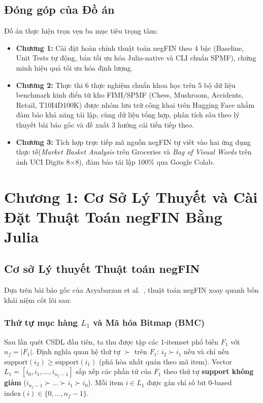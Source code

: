 \documentclass[conference]{IEEEtran}
\begin{document}
\subsection{Đóng góp của Đồ án}
Đồ án thực hiện trọn vẹn ba mục tiêu trọng tâm:
\begin{itemize}
    \item \textbf{Chương 1:} Cài đặt hoàn chỉnh thuật toán negFIN theo 4 bậc (Baseline, Unit Tests tự động, bản tối ưu hóa Julia-native và CLI chuẩn SPMF), chứng minh hiệu quả tối ưu hóa định lượng.
    \item \textbf{Chương 2:} Thực thi 6 thực nghiệm chuẩn khoa học trên 5 bộ dữ liệu benchmark kinh điển từ kho FIMI/SPMF (Chess, Mushroom, Accidents, Retail, T10I4D100K) được nhóm lưu trữ công khai trên Hugging Face nhằm đảm bảo khả năng tái lập, cùng dữ liệu tổng hợp, phân tích sâu theo lý thuyết bài báo gốc và đề xuất 3 hướng cải tiến tiếp theo.
    \item \textbf{Chương 3:} Tích hợp trực tiếp mã nguồn negFIN tự viết vào hai ứng dụng thực tế(\textit{Market Basket Analysis} trên Groceries và \textit{Bag of Visual Words} trên ảnh UCI Digits 8$\times$8), đảm bảo tái lập 100\% qua Google Colab.
\end{itemize}

\section{Chương 1: Cơ Sở Lý Thuyết và Cài Đặt Thuật Toán negFIN Bằng Julia}

\subsection{Cơ sở Lý thuyết Thuật toán negFIN}
Dựa trên bài báo gốc của Aryabarzan et al.~\cite{b9}, thuật toán negFIN xoay quanh bốn khái niệm cốt lõi sau:

\subsubsection{Thứ tự mục hàng $L_1$ và Mã hóa Bitmap (BMC)}
Sau lần quét CSDL đầu tiên, ta thu được tập các 1-itemset phổ biến $F_1$ với $n_f = |F_1|$. Định nghĩa quan hệ thứ tự $\succ$ trên $F_1$: $i_2 \succ i_1$ nếu và chỉ nếu $\text{support}(i_2) \ge \text{support}(i_1)$ (phá hòa nhất quán theo mã item). Vector $L_1 = [i_0, i_1, \dots, i_{n_f - 1}]$ sắp xếp các phần tử của $F_1$ theo thứ tự \textbf{support không giảm} ($i_{n_f - 1} \succ \dots \succ i_1 \succ i_0$). Mỗi item $i \in L_1$ được gán chỉ số bit 0-based $\text{index}(i) \in \{0, \dots, n_f - 1\}$.
\end{document}

